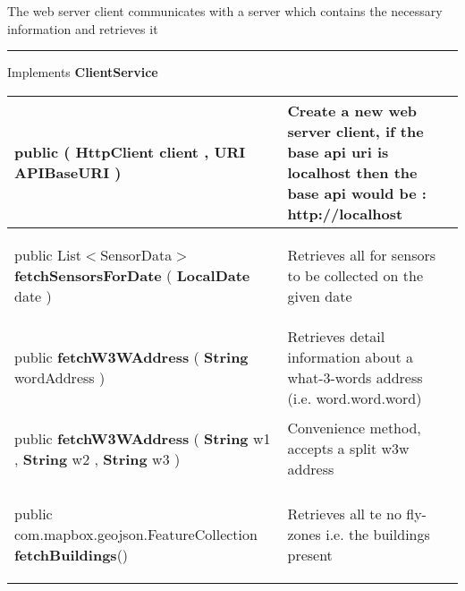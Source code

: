  {\scriptsize The web server client communicates with a server which contains the necessary information and retrieves it
 
\vspace*{4pt} \hrule \vspace*{3pt}
Implements \textbf{ ClientService }
\vspace*{-5pt} 
\begin{tabularx}{\linewidth}{X|m{}}
\label{tab:AQWebServerClient}
\begin{raggedleft}public  \textbf{\hyperref[tab:AQWebServerClient]{\color{blue}{AQWebServerClient}} }(\newline \hfill 
\hspace*{ 5pt} \textbf{HttpClient} client , \newline
 \hspace*{ 5pt} \textbf{URI} APIBaseURI  )
\end{raggedleft} &
 Create a new web server client, if the base api uri is localhost then the base api would be : http://localhost\\ \hline 
\begin{raggedleft}public List$<$SensorData$>$ \textbf{fetchSensorsForDate }(\hspace*{ 5pt} \textbf{LocalDate} date  )
\end{raggedleft} &
 Retrieves all \hyperref[tab:SensorData]{\color{blue}{SensorData}} for sensors to be collected on the given date\\ \hline 
\begin{raggedleft}public \hyperref[tab:W3WAddressData]{\color{blue}{W3WAddressData}} \textbf{fetchW3WAddress }(\hspace*{ 5pt} \textbf{String} wordAddress  )
\end{raggedleft} &
 Retrieves detail information about a what{-}3{-}words address (i.e. word.word.word)\\ \hline 
\begin{raggedleft}public \hyperref[tab:W3WAddressData]{\color{blue}{W3WAddressData}} \textbf{fetchW3WAddress }(\newline \hfill 
\hspace*{ 5pt} \textbf{String} w1 , \newline
 \hspace*{ 5pt} \textbf{String} w2 , \newline
 \hspace*{ 5pt} \textbf{String} w3  )
\end{raggedleft} &
 Convenience method, accepts a split w3w address\\ \hline 
\begin{raggedleft}public com.mapbox.geojson.FeatureCollection \textbf{fetchBuildings}()
\end{raggedleft} &
 Retrieves all te no fly{-}zones i.e. the buildings present\\\end{tabularx}
}
